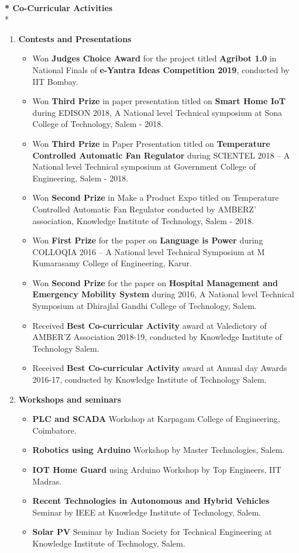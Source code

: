 \documentclass{article}
\begin{document}
\begin{flushleft}
 \textbf{\\* Co-Curricular Activities}
\\*
\begin{enumerate}
\item \textbf{Contests and Presentations}
\begin{itemize}
\item Won \textbf{Judges Choice Award} for the project titled \textbf{Agribot 1.0} in National Finals of \textbf{e-Yantra Ideas Competition 2019}, conducted by IIT Bombay.
\item Won \textbf{Third Prize} in paper presentation titled on \textbf{Smart Home IoT} during EDISON 2018, A National level Technical symposium at Sona College of Technology, Salem - 2018.
\item Won \textbf{Third Prize} in Paper Presentation titled on \textbf{Temperature Controlled Automatic Fan Regulator} during SCIENTEL 2018 – A National level Technical symposium at Government College of Engineering, Salem - 2018.
\item Won \textbf{Second Prize} in Make a Product Expo titled on Temperature Controlled Automatic Fan Regulator conducted by AMBERZ’ association, Knowledge Institute of Technology, Salem - 2018.
\item Won \textbf{First Prize} for the paper on \textbf{Language is Power} during COLLOQIA 2016 – A National level Technical Symposium at M Kumarasamy College of Engineering, Karur.
\item Won \textbf{Second Prize} for the paper on \textbf{Hospital Management and Emergency Mobility System } during 2016,  A National level Technical Symposium at Dhirajlal Gandhi College of Technology, Salem. 
\item Received \textbf{ Best Co-curricular Activity} award at Valedictory of AMBER'Z Association 2018-19, conducted by Knowledge Institute of Technology Salem.
\item Received \textbf{ Best Co-curricular Activity} award at Annual day Awards 2016-17, conducted by Knowledge Institute of Technology Salem.
\end{itemize}

\item \textbf{Workshops and seminars}
\begin{itemize}
\item \textbf{PLC and SCADA} Workshop at Karpagam College of Engineering, Coimbatore.
\item \textbf{Robotics using Arduino} Workshop by Master Technologies, Salem.
\item\textbf{IOT Home Guard} using Arduino Workshop by Top Engineers, IIT Madras.
\item\textbf{Recent Technologies in Autonomous and Hybrid Vehicles} Seminar by IEEE at Knowledge Institute of Technology, Salem.
\item \textbf{Solar PV} Seminar by Indian Society for Technical Engineering at Knowledge Institute of Technology, Salem. 

\end{itemize}
\end{enumerate}

\end{flushleft}
\end{document}
